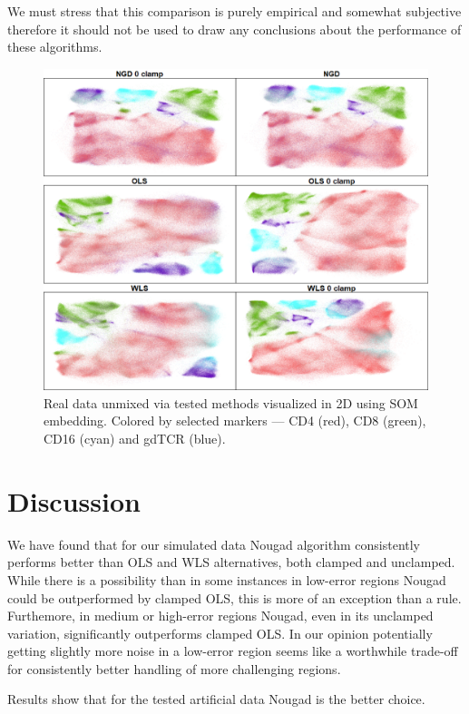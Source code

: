 We must stress that this comparison is purely empirical and somewhat subjective therefore it should not be used to draw any conclusions about the performance of these algorithms.

\begin{figure}
  \includegraphics[width=1\linewidth]{img/6way_asinh1000v2.png}
  \caption{Real data unmixed via tested methods visualized in 2D using SOM embedding. Colored by selected markers --- CD4 (red), CD8 (green), CD16 (cyan) and gdTCR (blue).}
  \label{fig:6-way_nb}
\end{figure}

\section{Discussion}
We have found that for our simulated data Nougad algorithm consistently performs better than OLS and WLS alternatives, both clamped and unclamped. While there is a possibility than in some instances in low-error regions Nougad could be outperformed by clamped OLS, this is more of an exception than a rule. Furthemore, in medium or high-error regions Nougad, even in its unclamped variation, significantly outperforms clamped OLS. In our opinion potentially getting slightly more noise in a low-error region seems like a worthwhile trade-off for consistently better handling of more challenging regions.  

Results show that for the tested artificial data Nougad is the better choice. 


